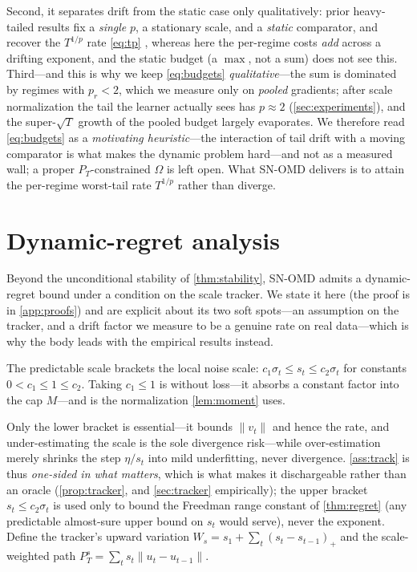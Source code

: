 \documentclass{article}
\newcommand{\norm}[1]{\lVert #1 \rVert}
\begin{document}
Second, it separates drift from the static case only qualitatively: prior heavy-tailed
results fix a \emph{single} $p$, a stationary scale, and a \emph{static} comparator, and
recover the $T^{1/p}$ rate \eqref{eq:tp} \citep{liu2026oco,zhangcutkosky2022,bubeck2013},
whereas here the per-regime costs \emph{add} across a drifting exponent, and the static
budget (a $\max$, not a sum) does not see this. Third---and this is why we keep
\eqref{eq:budgets} \emph{qualitative}---the sum is dominated by regimes with $p_r<2$,
which we measure only on \emph{pooled} gradients; after scale normalization the tail the
learner actually sees has $p\approx2$ (\cref{sec:experiments}), and the super-$\sqrt T$
growth of the pooled budget largely evaporates. We therefore read \eqref{eq:budgets} as
a \emph{motivating heuristic}---the interaction of tail drift with a moving comparator is
what makes the dynamic problem hard---and not as a measured wall; a proper
$P_T$-constrained $\Omega$ is left open. What SN-OMD delivers is to attain the per-regime
worst-tail rate $T^{1/p}$ rather than diverge.

\section{Dynamic-regret analysis}
\label{app:regret}

Beyond the unconditional stability of \cref{thm:stability}, SN-OMD admits a dynamic-regret
bound under a condition on the scale tracker. We state it here (the proof is in
\cref{app:proofs}) and are explicit about its two soft spots---an assumption on the
tracker, and a drift factor we measure to be a genuine rate on real data---which is why
the body leads with the empirical results instead.

\begin{assumption}
\label{ass:track}
The predictable scale brackets the local noise scale: $c_1\sigma_t\le s_t\le
c_2\sigma_t$ for constants $0<c_1\le1\le c_2$. Taking $c_1\le1$ is without loss---it absorbs
a constant factor into the cap $M$---and is the normalization \cref{lem:moment} uses.
\end{assumption}
Only the lower bracket is essential---it bounds $\norm{v_t}$ and hence the rate, and
under-estimating the scale is the sole divergence risk---while over-estimation merely
shrinks the step $\eta/s_t$ into mild underfitting, never divergence. \cref{ass:track}
is thus \emph{one-sided in what matters}, which is what makes it dischargeable rather than an
oracle (\cref{prop:tracker}, and \cref{sec:tracker} empirically); the upper bracket
$s_t\le c_2\sigma_t$ is used only to bound the Freedman range constant of \cref{thm:regret}
(any predictable almost-sure upper bound on $s_t$ would serve), never the exponent. Define the tracker's upward
variation $W_s=s_1+\sum_t(s_t-s_{t-1})_+$ and the scale-weighted path
$P_T^s=\sum_t s_t\norm{u_t-u_{t-1}}$.
\end{document}
